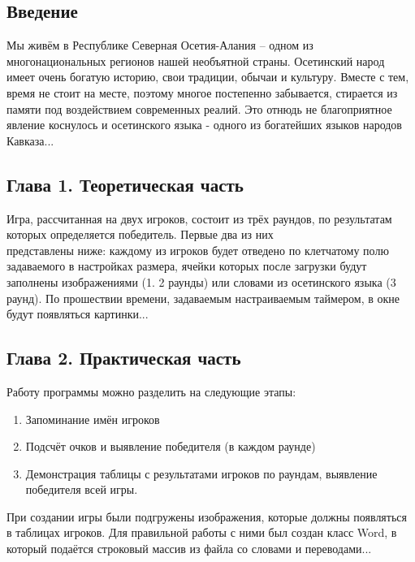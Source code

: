 \documentclass[14pt, a4paper]{extarticle}
\begin{document}
\begin{center}
\section*{Введение}
\end{center}
\par Мы живём в Республике Северная Осетия-Алания – одном из \\ многонациональных регионов нашей необъятной страны. Осетинский народ имеет очень богатую историю, свои традиции, обычаи и культуру. Вместе с тем, время не стоит на месте, поэтому многое постепенно забывается, стирается из памяти под воздействием современных реалий. Это отнюдь не благоприятное явление коснулось и осетинского языка - одного из богатейших языков народов Кавказа...
\newpage
\setcounter{subsection}{0}
\setcounter{equation}{0}
\setcounter{section}{0}

\begin{center}
\section*{Глава 1. Теоретическая часть}
\end{center}
\par Игра, рассчитанная на двух игроков, состоит из трёх раундов, по результатам которых определяется победитель. Первые два из них \\представлены ниже: каждому из игроков будет отведено по клетчатому полю задаваемого в настройках размера, ячейки которых после загрузки будут заполнены изображениями (1. 2 раунды) или словами из осетинского языка (3 раунд). По прошествии времени, задаваемым настраиваемым таймером, в окне будут появляться картинки...
\newpage
\setcounter{subsection}{0}
\setcounter{equation}{0}
\setcounter{section}{0}

\begin{center}
\section*{Глава 2. Практическая часть}
\end{center}
\par Работу программы можно разделить на следующие этапы: 
\begin{enumerate}
    \item Запоминание имён игроков 
    \item Подсчёт очков и выявление победителя (в каждом раунде) 
    \item Демонстрация таблицы с результатами игроков по раундам, выявление победителя всей игры. 
\end{enumerate}
\par При создании игры были подгружены изображения, которые должны появляться в таблицах игроков. Для правильной работы с ними был создан класс Word, в который подаётся строковый массив из файла со словами и переводами...
\newpage
\setcounter{subsection}{0}
\setcounter{equation}{0}
\setcounter{section}{0}
\end{document}
